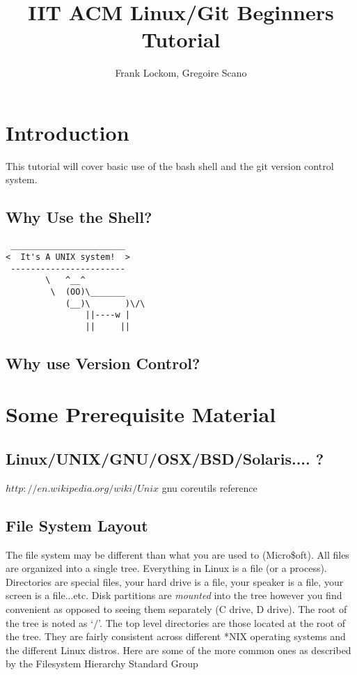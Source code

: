 \documentclass[10pt]{article}
\title{IIT ACM Linux/Git Beginners Tutorial}
\author{Frank Lockom, Gregoire Scano}
\begin{document}
\maketitle

\section{Introduction}
This tutorial will cover basic use of the bash shell and the git version control system.

  \subsection{Why Use the Shell?}

  \begin{verbatim}
 _______________________ 
<  It's A UNIX system!  >
 ----------------------- 
        \   ^__^
         \  (OO)\_______
            (__)\       )\/\
                ||----w |
                ||     ||
  \end{verbatim}


  \subsection{Why use Version Control?}

\section{Some Prerequisite Material}

  \subsection{Linux/UNIX/GNU/OSX/BSD/Solaris.... ?}
  $http://en.wikipedia.org/wiki/Unix$
  gnu coreutils reference
  \subsection{File System Layout}  
  The file system may be different than what you are used to (Micro\$oft). All files are organized into a single tree. Everything in Linux is a file (or a process). Directories are special files, your hard drive is a file, your speaker is a file, your screen is a file...etc. Disk partitions are \textit{mounted} into the tree however you find convenient as opposed to seeing them separately (C drive, D drive). The root of the tree is noted as `$/$'. The top level directories are those located at the root of the tree. They are fairly consistent across different *NIX operating systems and the different Linux distros. Here are some of the more common ones as described by the Filesystem Hierarchy Standard Group~\cite{fhs}
\end{document}
